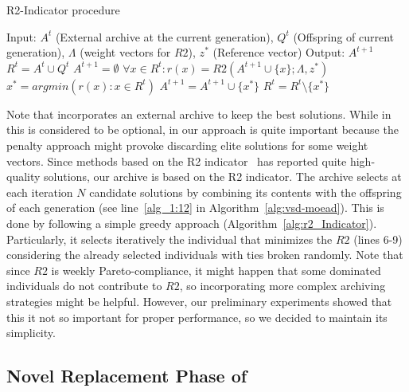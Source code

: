 \begin{algorithm}[!t]
        \caption{R2-Indicator procedure}
        \begin{small}
\begin{algorithmic}[1]
	\STATE Input: $A^t$ (External archive at the current generation), $Q^t$ (Offspring of current generation), $\Lambda$ (weight vectors for $R2$), $z^*$ (Reference vector)
	\STATE Output: $A^{t+1}$
	\STATE $R^t= A^t \cup Q^t$
	\STATE $A^{t+1} = \emptyset$
	\STATE $\forall x \in R^t : r(x) = R2(A^{t+1} \cup \{x\}; \Lambda, z^*)$
	\STATE $x^* = argmin(r(x):x \in R^t)$ 
	\STATE $A^{t+1} = A^{t+1} \cup \{x^*\}$
	\STATE $R^t = R^t \setminus \{ x^* \}$ 
  	\ENDWHILE
        \end{algorithmic}
        \end{small}
\label{alg:r2_Indicator}
\end{algorithm}

Note that \AVSDMOEAD{} incorporates an external archive to keep the best solutions.
%
While in \MOEAD{} this is considered to be optional, in our approach is quite important because the penalty approach
might provoke discarding elite solutions for some weight vectors.
%
Since methods based on the R2 indicator~\cite{trautmann2013r2} has reported quite high-quality solutions, our
archive is based on the R2 indicator.
%
The archive selects at each iteration $N$ candidate solutions by combining its contents with the offspring of each 
generation (see line~\ref{alg_1:12} in Algorithm~\ref{alg:vsd-moead}).
%
This is done by following a simple greedy approach (Algorithm~\ref{alg:r2_Indicator}).
%
Particularly, it selects iteratively the individual that minimizes the $R2$ (lines 6-9) considering
the already selected individuals with ties broken randomly.
%
Note that since $R2$ is weekly Pareto-compliance, it might happen that some dominated individuals do not contribute
to $R2$, so incorporating more complex archiving strategies might be helpful.
%
However, our preliminary experiments showed that this it not so important for proper performance, so we decided to maintain
its simplicity.

%
\subsection{Novel Replacement Phase of \AVSDMOEAD{} }

